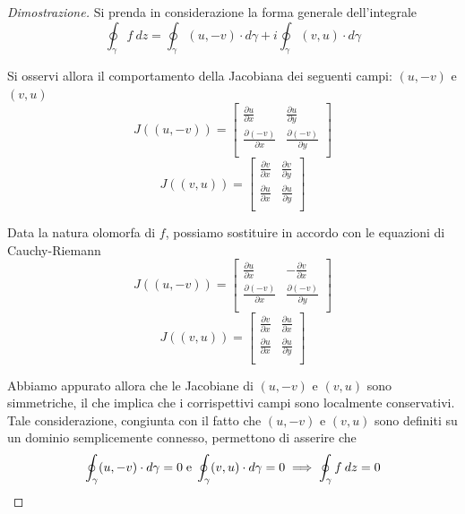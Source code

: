             \begin{proof}[Dimostrazione]
                Si prenda in considerazione la forma generale dell'integrale
                \[
                    \oint_{\gamma} f \: dz = \oint_{\gamma} (u, -v) \cdot d\gamma + i \oint_{\gamma} (v, u) \cdot d\gamma
                \]

                Si osservi allora il comportamento della Jacobiana dei seguenti campi: $(u, -v)$ e $(v, u)$
                \[
                    J((u, -v)) =
                    \begin{bmatrix}
                        \frac{\partial u}{\partial x} & \frac{\partial u}{\partial y} \\[1em]
                        \frac{\partial (-v)}{\partial x} & \frac{\partial (-v)}{\partial y} \\
                    \end{bmatrix}
                \]
                \[
                    J((v, u)) =
                    \begin{bmatrix}
                        \frac{\partial v}{\partial x} & \frac{\partial v}{\partial y} \\[1em]
                        \frac{\partial u}{\partial x} & \frac{\partial u}{\partial y} \\
                    \end{bmatrix}
                \]

                Data la natura olomorfa di $f$, possiamo sostituire in accordo con le equazioni di Cauchy-Riemann
                \[
                    J((u, -v)) =
                    \begin{bmatrix}
                        \frac{\partial u}{\partial x} & -\frac{\partial v}{\partial x} \\[1em]
                        \frac{\partial (-v)}{\partial x} & \frac{\partial (-v)}{\partial y} \\
                    \end{bmatrix}
                \]
                \[
                    J((v, u)) =
                    \begin{bmatrix}
                        \frac{\partial v}{\partial x} & \frac{\partial u}{\partial x} \\[1em]
                        \frac{\partial u}{\partial x} & \frac{\partial u}{\partial y} \\
                    \end{bmatrix}
                \]

                Abbiamo appurato allora che le Jacobiane di $(u, -v)$ e $(v, u)$ sono simmetriche, il che implica che i corrispettivi campi sono localmente conservativi.
                Tale considerazione, congiunta con il fatto che $(u, -v)$ e $(v, u)$ sono definiti su un dominio semplicemente connesso, permettono di asserire che
                \[
                    \oint_{\gamma} (u, -v) \cdot d\gamma = 0 \; \textnormal{e} \; \oint_{\gamma} (v, u) \cdot d\gamma = 0 \implies \oint_{\gamma} f \: dz = 0
                \]
            \end{proof}

